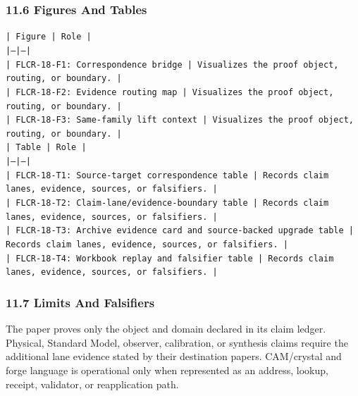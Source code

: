 \documentclass[11pt]{article}
\begin{document}
\subsubsection*{11.6 Figures And Tables}

\noindent\texttt{| Figure | Role |}\\
\noindent\texttt{|---|---|}\\
\noindent\texttt{| FLCR-18-F1: Correspondence bridge | Visualizes the proof object, routing, or boundary. |}\\
\noindent\texttt{| FLCR-18-F2: Evidence routing map | Visualizes the proof object, routing, or boundary. |}\\
\noindent\texttt{| FLCR-18-F3: Same-family lift context | Visualizes the proof object, routing, or boundary. |}\\

\noindent\texttt{| Table | Role |}\\
\noindent\texttt{|---|---|}\\
\noindent\texttt{| FLCR-18-T1: Source-target correspondence table | Records claim lanes, evidence, sources, or falsifiers. |}\\
\noindent\texttt{| FLCR-18-T2: Claim-lane/evidence-boundary table | Records claim lanes, evidence, sources, or falsifiers. |}\\
\noindent\texttt{| FLCR-18-T3: Archive evidence card and source-backed upgrade table | Records claim lanes, evidence, sources, or falsifiers. |}\\
\noindent\texttt{| FLCR-18-T4: Workbook replay and falsifier table | Records claim lanes, evidence, sources, or falsifiers. |}\\

\subsubsection*{11.7 Limits And Falsifiers}

The paper proves only the object and domain declared in its claim ledger.
Physical, Standard Model, observer, calibration, or synthesis claims require
the additional lane evidence stated by their destination papers. CAM/crystal
and forge language is operational only when represented as an address, lookup,
receipt, validator, or reapplication path.
\end{document}
